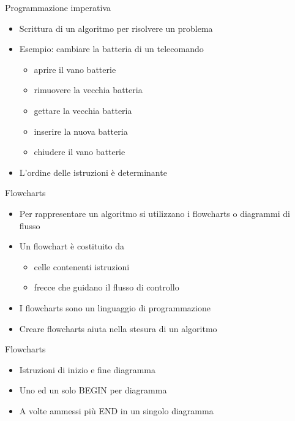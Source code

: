 \begin{frame}{Programmazione imperativa}
  \vfill
  \begin{itemize}
    \item Scrittura di un \alert{algoritmo} per risolvere un problema
    \vfill
    \item Esempio: cambiare la batteria di un telecomando
    \begin{itemize}
      \item aprire il vano batterie
      \item rimuovere la vecchia batteria
      \item gettare la vecchia batteria
      \item inserire la nuova batteria
      \item chiudere il vano batterie
    \end{itemize}
    \vfill
    \item L'ordine delle istruzioni è determinante
  \end{itemize}
  \vfill
\end{frame}

\begin{frame}{Flowcharts}
  \vfill
  \begin{itemize}
    \item Per rappresentare un algoritmo si utilizzano i \alert{flowcharts} o \alert{diagrammi di flusso}
    \vfill
    \item Un flowchart è costituito da
    \begin{itemize}
      \item celle contenenti istruzioni
      \item frecce che guidano il \alert{flusso di controllo}
    \end{itemize}
    \vfill
    \item I flowcharts sono un linguaggio di programmazione
    \vfill
    \item Creare flowcharts aiuta nella stesura di un algoritmo
  \end{itemize}
  \vfill
\end{frame}

\begin{frame}{Flowcharts}
  \vfill
  \begin{center}\end{center}
  \vfill
  \begin{itemize}
    \item Istruzioni di inizio e fine diagramma
    \vfill
    \item Uno ed un solo \alert{BEGIN} per diagramma
    \vfill
    \item A volte ammessi più \alert{END} in un singolo diagramma
  \end{itemize}
\end{frame}

